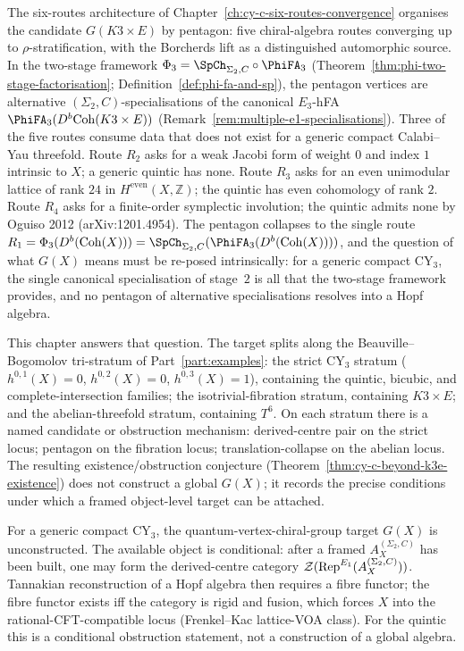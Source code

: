 The six-routes architecture of Chapter~\ref{ch:cy-c-six-routes-convergence} organises
the candidate $G(K3 \times E)$ by pentagon: five chiral-algebra routes converging up to
$\rho$-stratification, with the Borcherds lift as a distinguished automorphic source.
In the two-stage framework $\Phi_3 = \SpCh_{\Sigma_2, C} \circ \PhiFA_3$
(Theorem~\ref{thm:phi-two-stage-factorisation};
Definition~\ref{def:phi-fa-and-sp}), the pentagon vertices are alternative
$(\Sigma_2, C)$-specialisations of the canonical $E_3$-hFA $\PhiFA_3(D^b\Coh(K3
\times E))$ (Remark~\ref{rem:multiple-e1-specialisations}).
Three of the five routes consume data that does not exist for a generic compact
Calabi--Yau threefold. Route $R_2$ asks for a weak Jacobi form of weight $0$ and
index $1$ intrinsic to $X$; a generic quintic has none. Route $R_3$ asks for an even
unimodular lattice of rank $24$ in $H^{\mathrm{even}}(X, \mathbb{Z})$; the quintic has
even cohomology of rank $2$. Route $R_4$ asks for a finite-order symplectic involution;
the quintic admits none by Oguiso 2012 (arXiv:1201.4954). The pentagon collapses to the
single route $R_1 = \Phi_3(D^b(\Coh(X))) = \SpCh_{\Sigma_2, C}(\PhiFA_3(D^b(\Coh(X))))$,
and the question of what $G(X)$ means must be re-posed intrinsically: for a generic
compact CY$_3$, the single canonical specialisation of stage~$2$ is all that the
two-stage framework provides, and no pentagon of alternative specialisations resolves
into a Hopf algebra.

This chapter answers that question. The target splits along the Beauville--Bogomolov
tri-stratum of Part~\ref{part:examples}: the strict CY$_3$ stratum ($h^{0,1}(X) = 0$,
$h^{0,2}(X) = 0$, $h^{0,3}(X) = 1$), containing the quintic, bicubic, and
complete-intersection families; the
isotrivial-fibration stratum, containing $K3 \times E$; and the abelian-threefold
stratum, containing $T^6$. On each stratum there is a named candidate or obstruction
mechanism: derived-centre pair on the strict locus; pentagon on the fibration locus;
translation-collapse on the abelian locus. The resulting existence/obstruction conjecture
(Theorem~\ref{thm:cy-c-beyond-k3e-existence}) does not construct a global $G(X)$; it
records the precise conditions under which a framed object-level target can be attached.

For a generic compact CY$_3$, the quantum-vertex-chiral-group target $G(X)$ is
unconstructed. The available object is conditional: after a framed $A_X^{(\Sigma_2,C)}$
has been built, one may form the derived-centre category
$\mathcal{Z}(\mathrm{Rep}^{E_{1}}(A_X^{(\Sigma_2,C)}))$. Tannakian reconstruction of a
Hopf algebra then requires a fibre functor; the fibre functor exists iff the category is
rigid and fusion, which forces $X$ into the rational-CFT-compatible locus
(Frenkel--Kac lattice-VOA class). For the quintic this is a conditional obstruction
statement, not a construction of a global algebra.

